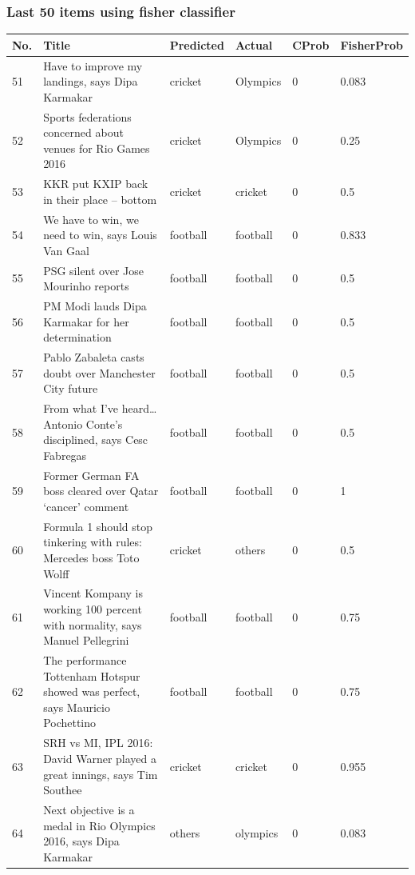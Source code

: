 \documentclass[12pt]{article}
\begin{document}
\subsubsection{Last 50 items using fisher classifier }
\begin{longtable}{|p{2.0cm} | p{6.0cm} | p{2.0cm} |p{2.0cm}| p{2.0cm}|p{2.0cm}|}\hline
\textbf{No.} & \textbf{Title} & \textbf{Predicted} & \textbf{Actual} &  \textbf{CProb}  & \textbf{FisherProb}\\\hline
51 & Have to improve my landings, says Dipa Karmakar & cricket & Olympics & 0 & 0.083 \\\hline													
52 & Sports federations concerned about venues for Rio Games 2016 & cricket & Olympics & 0 & 0.25 \\\hline													
53 & KKR put KXIP back in their place – bottom & cricket & cricket & 0 & 0.5 \\\hline													
54 & We have to win, we need to win, says Louis Van Gaal & football & football & 0 & 0.833 \\\hline													
55 & PSG silent over Jose Mourinho reports & football & football & 0 & 0.5 \\\hline													
56 & PM Modi lauds Dipa Karmakar for her determination & football & football & 0 & 0.5 \\\hline													
57 & Pablo Zabaleta casts doubt over Manchester City future & football & football & 0 & 0.5 \\\hline													
58 & From what I’ve heard… Antonio Conte’s disciplined, says Cesc Fabregas & football & football & 0 & 0.5 \\\hline													
59 & Former German FA boss cleared over Qatar ‘cancer’ comment & football & football & 0 & 1 \\\hline													
60 & Formula 1 should stop tinkering with rules: Mercedes boss Toto Wolff & cricket & others & 0 & 0.5 \\\hline													
61 & Vincent Kompany is working 100 percent with normality, says Manuel Pellegrini & football & football & 0 & 0.75 \\\hline													
62 & The performance Tottenham Hotspur showed was perfect, says Mauricio Pochettino & football & football & 0 & 0.75 \\\hline													
63 & SRH vs MI, IPL 2016: David Warner played a great innings, says Tim Southee & cricket & cricket & 0 & 0.955 \\\hline													
64 & Next objective is a medal in Rio Olympics 2016, says Dipa Karmakar & others & olympics & 0 & 0.083 \\\hline													

\end{longtable}
\end{document}
